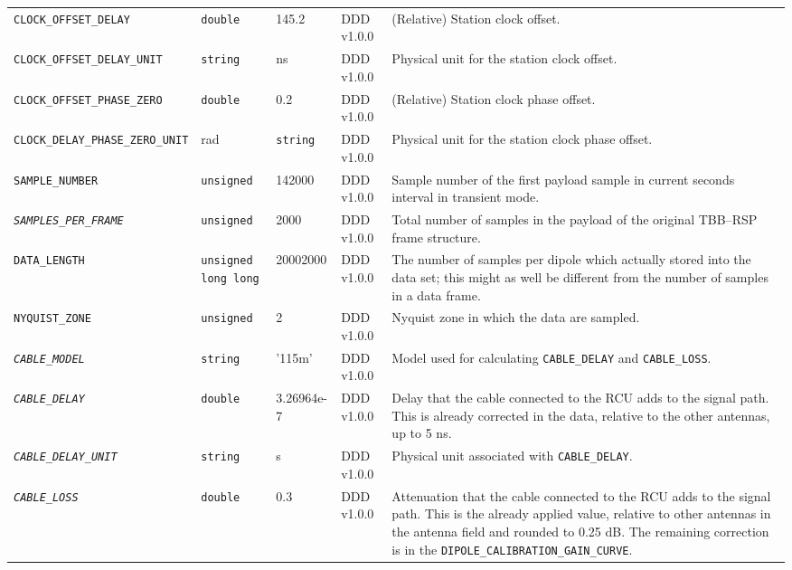 \documentclass[a4paper,10pt,bibtotoc]{scrartcl}
\begin{document}
\begin{landscape}
\begin{center}
\begin{supertabular}{|llllp{5.25cm}|}
    \small {\texttt{CLOCK\_OFFSET\_DELAY}} & \verb|double|  & 145.2& DDD v1.0.0 & (Relative) Station clock offset. \\
    \small {\texttt{CLOCK\_OFFSET\_DELAY\_UNIT}} & \verb|string|  & ns & DDD v1.0.0 & Physical unit for the station clock offset. \\
    \small {\texttt{CLOCK\_OFFSET\_PHASE\_ZERO}}  & \verb|double| & 0.2 & DDD v1.0.0 & (Relative) Station clock phase offset. \\
    \small {\texttt{CLOCK\_DELAY\_PHASE\_ZERO\_UNIT}} & rad &\verb|string| & DDD v1.0.0 & Physical unit for the station clock phase offset. \\
    \small {\texttt{SAMPLE\_NUMBER}} & \verb|unsigned| & 142000 & DDD v1.0.0 & Sample number of the first payload sample in current seconds interval in transient mode. \\
    \small \textit{\texttt{SAMPLES\_PER\_FRAME}} & \verb|unsigned| & 2000 & DDD v1.0.0 & Total number of samples in the payload of the original TBB--RSP frame structure. \\
    \small {\texttt{DATA\_LENGTH}} & \verb|unsigned long long| & 20002000 &DDD v1.0.0 & The number of samples per dipole which actually stored into the data set; this might as well be different from the number of samples in a data frame. \\
    \small {\texttt{NYQUIST\_ZONE}} & \verb|unsigned| & 2 & DDD v1.0.0  & Nyquist zone in which the data are sampled. \\
    \small \textit{\texttt{CABLE\_MODEL}} & \verb|string| & '115m' &  DDD v1.0.0 & Model used for calculating \texttt{CABLE\_DELAY} and \texttt{CABLE\_LOSS}. \\
    \small \textit{\texttt{CABLE\_DELAY}} & \verb|double| & 3.26964e-7 &  DDD v1.0.0 & Delay that the cable connected to the RCU adds to the signal path. This is already corrected in the data, relative to the other antennas, up to 5 ns. \\
    \small \textit{\texttt{CABLE\_DELAY\_UNIT}} & \verb|string| & s & DDD v1.0.0 & Physical unit associated with \verb|CABLE_DELAY|. \\
    \small \textit{\texttt{CABLE\_LOSS}} & \verb|double| & 0.3 & DDD v1.0.0 & Attenuation that the cable connected to the RCU adds to the signal path. This is the already applied value, relative to other antennas in the antenna field and rounded to 0.25 dB. The remaining correction is in the  \texttt{DIPOLE\_CALIBRATION\_GAIN\_CURVE}. \\

\end{supertabular}
\end{center}
\end{landscape}
\end{document}
